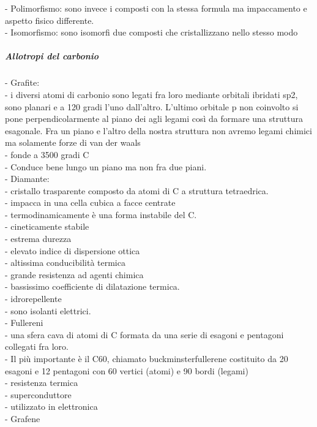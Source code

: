 \tab\tab- Polimorfismo: sono invece i composti  con la stessa formula ma impaccamento e aspetto fisico differente. \\
\tab\tab- Isomorfismo: sono isomorfi due composti che cristallizzano nello stesso modo
\subparagraph{Allotropi del carbonio}
\tab- Grafite:\\
\tab\tab- i diversi atomi di carbonio sono legati fra loro mediante orbitali ibridati sp2, sono planari e a 120 gradi l’uno dall’altro. L’ultimo orbitale p non coinvolto si pone perpendicolarmente al piano dei agli legami così da formare una struttura esagonale. Fra un piano e l’altro della nostra struttura non avremo legami chimici ma solamente forze di van der waals\\
\tab\tab- fonde a 3500 gradi C\\
\tab\tab- Conduce bene lungo un piano ma non fra due piani. \\
\tab- Diamante:\\
\tab\tab- cristallo trasparente composto da atomi di C a struttura tetraedrica. \\
\tab\tab- impacca in una cella cubica a facce centrate\\
\tab\tab- termodinamicamente è una forma instabile del C.\\
\tab\tab- cineticamente stabile\\
\tab\tab- estrema durezza\\
\tab\tab- elevato indice di dispersione ottica\\
\tab\tab- altissima conducibilità termica\\
\tab\tab- grande resistenza ad agenti chimica\\
\tab\tab- bassissimo coefficiente di dilatazione termica.\\
\tab\tab- idrorepellente\\
\tab\tab- sono isolanti elettrici. \\
\tab- Fullereni\\
\tab\tab- una sfera cava di atomi di C formata da una serie di esagoni e pentagoni collegati fra loro.\\
\tab\tab- Il più importante è il C60, chiamato buckminsterfullerene costituito da 20 esagoni e 12 pentagoni con 60 vertici (atomi) e 90 bordi (legami)\\
\tab\tab- resistenza termica\\
\tab\tab- superconduttore\\
\tab\tab- utilizzato in elettronica\\
\tab- Grafene\\
